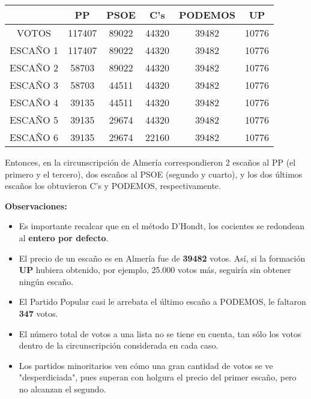 \documentclass[11pt]{article}
\newcommand\console[1]{{\inconsolata #1}}
\begin{document}
	\console{
		\begin{center}
			\begin{tabular}{|c|c|c|c|c|c|}
				\hline
		 		& \textbf{PP} & \textbf{PSOE} & \textbf{C's} & \textbf{PODEMOS} & \textbf{UP} \\
				\hline
				VOTOS & 117407 & 89022 & 44320 & 39482 & 10776 \\
				\hline
				ESCAÑO 1 &\cellcolor{gray!25} 117407 & 89022 & 44320 & 39482 & 10776 \\
				\hline
				ESCAÑO 2 & 58703 &\cellcolor{gray!25} 89022 & 44320 & 39482 & 10776 \\
				\hline
				ESCAÑO 3 &\cellcolor{gray!25} 58703 & 44511 & 44320 & 39482 & 10776 \\
				\hline
				ESCAÑO 4 & 39135 &\cellcolor{gray!25} 44511 & 44320 & 39482 & 10776 \\
				\hline
				ESCAÑO 5 & 39135 & 29674 &\cellcolor{gray!25} 44320 & 39482 & 10776 \\
				\hline
				ESCAÑO 6 & 39135 & 29674 & 22160 &\cellcolor{gray!25} 39482 & 10776 \\
				\hline
			\end{tabular}
		\end{center}
	}
	
	
\vspace{1em}
  Entonces, en la circunscripción de Almería correspondieron 2 escaños al PP (el primero y el tercero), dos escaños al PSOE (segundo y cuarto), y los dos últimos escaños los obtuvieron C's y PODEMOS, respectivamente.
  
  \textbf{Observaciones:}
  
  \begin{itemize}
  \item Es importante recalcar que en el método D'Hondt, los cocientes se redondean al \textbf{entero por defecto}.
  \item El precio de un escaño es en Almería fue de \textbf{39482} votos. Así, si la formación \textbf{UP} hubiera obtenido, por ejemplo, 25.000 votos más, seguiría sin obtener ningún escaño.
  \item El Partido Popular casi le arrebata el último escaño a PODEMOS, le faltaron \textbf{347} votos.
  \item El número total de votos a una lista no se tiene en cuenta, tan sólo los votos dentro de la circunscripción considerada en cada caso.
  \item Los partidos minoritarios ven cómo una gran cantidad de votos se ve "desperdiciada", pues superan con holgura el precio del primer escaño, pero no alcanzan el segundo.
	\end{itemize}
	
\end{document}
